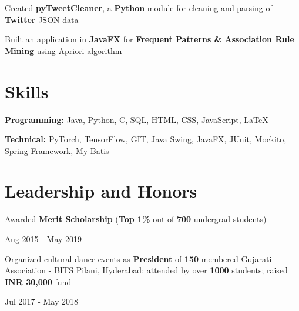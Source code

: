 \documentclass[]{Keval-resume}
\begin{document}
\textbullet{} Created \textbf{pyTweetCleaner}, a \textbf{Python} module for cleaning and parsing of \textbf{Twitter} JSON data

\textbullet{} Built an application in \textbf{JavaFX} for \textbf{Frequent Patterns \& Association Rule Mining} using Apriori algorithm





\sectionsep

\section{Skills} 
\hrulefill
\postsectionsep

\textbullet{} \textbf{Programming:} Java, Python, C, SQL, HTML, CSS, JavaScript, LaTeX

\textbullet{} \textbf{Technical:} PyTorch, TensorFlow, GIT, Java Swing, JavaFX, JUnit, Mockito, Spring Framework, My Batis

\sectionsep

\section{Leadership and Honors} 
\hrulefill
\postsectionsep 

\begin{minipage}[t]{.78\textwidth}
	\textbullet{} Awarded \textbf{Merit Scholarship} (\textbf{Top 1\%} out of \textbf{700} undergrad students)
\end{minipage}%
\begin{minipage}[t]{.22\textwidth}
	\hfill Aug 2015 - May 2019
\end{minipage}

\begin{minipage}[t]{.78\textwidth}
	\textbullet{} Organized cultural dance events as \textbf{President} of \textbf{150}-membered Gujarati Association - BITS Pilani, Hyderabad; attended by over \textbf{1000} students; raised \textbf{INR 30,000} fund
\end{minipage}%
\begin{minipage}[t]{.22\textwidth}
	\hfill Jul 2017 - May 2018
\end{minipage}


\end{document}
